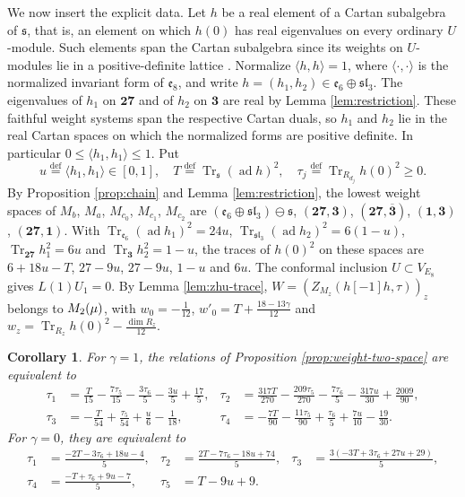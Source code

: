 \documentclass[leqno]{article}
\let\cal\relax
\newcommand{\cal}{\mathcal}
\renewcommand{\leq}{\ensuremath{\leqslant}}
\renewcommand{\geq}{\ensuremath{\geqslant}}
\newcommand{\ov}{\overset}
\newtheorem{cor}[thm]{Corollary}
\numberwithin{equation}{section}
\begin{document}
We now insert the explicit data. Let $h$ be a real element of a Cartan subalgebra of $\mathfrak s$, that is, an element on which $h(0)$ has real eigenvalues on every ordinary $U$-module. Such elements span the Cartan subalgebra since its weights on $U$-modules lie in a positive-definite lattice \cite[Theorem 1 p.~3]{Mas14}. Normalize $\langle h,h\rangle = 1$, where $\langle\cdot,\cdot\rangle$ is the normalized invariant form of $\mathfrak e_8$, and write $h = (h_1,h_2) \in \mathfrak e_6 \oplus \mathfrak{sl}_3$. The eigenvalues of $h_1$ on $\mathbf{27}$ and of $h_2$ on $\mathbf3$ are real by Lemma \ref{lem:restriction}. These faithful weight systems span the respective Cartan duals, so $h_1$ and $h_2$ lie in the real Cartan spaces on which the normalized forms are positive definite. In particular $0 \leq \langle h_1,h_1\rangle \leq 1$. Put
\[
u \ov{\mathrm{def}}{=} \langle h_1,h_1\rangle \in [0,1],\quad T \ov{\mathrm{def}}{=} \operatorname{Tr}_{\mathfrak s}(\operatorname{ad}h)^2,\quad \tau_j \ov{\mathrm{def}}{=} \operatorname{Tr}_{R_{d_j}}h(0)^2 \geq 0.
\]
By Proposition \ref{prop:chain} and Lemma \ref{lem:restriction}, the lowest weight spaces of $M_b$, $M_a$, $M_{c_0}$, $M_{c_1}$, $M_{c_2}$ are $(\mathfrak e_6 \oplus \mathfrak{sl}_3) \ominus \mathfrak s$, $(\mathbf{27},\mathbf 3)$, $(\mathbf{27},\overline{\mathbf 3})$, $(\mathbf 1,\mathbf 3)$, $(\mathbf{27},\mathbf 1)$. With $\operatorname{Tr}_{\mathfrak e_6}(\operatorname{ad}h_1)^2 = 24u$, $\operatorname{Tr}_{\mathfrak{sl}_3}(\operatorname{ad}h_2)^2 = 6(1-u)$, $\operatorname{Tr}_{\mathbf{27}}h_1^2 = 6u$ and $\operatorname{Tr}_{\mathbf 3}h_2^2 = 1-u$, the traces of $h(0)^2$ on these spaces are $6+18u-T$, $27-9u$, $27-9u$, $1-u$ and $6u$. The conformal inclusion $U \subset V_{E_8}$ gives $L(1)U_1 = 0$. By Lemma \ref{lem:zhu-trace}, $W = (Z_{M_z}(h[-1]h,\tau))_z$ belongs to $\cal M_2(\mu)$, with $w_0 = -\frac{1}{12}$, $w'_0 = T+\frac{18-13\gamma}{12}$ and $w_z = \operatorname{Tr}_{R_z}h(0)^2-\frac{\dim R_z}{12}$.

\begin{cor}
\label{cor:tau-formulas}
For $\gamma = 1$, the relations of Proposition \ref{prop:weight-two-space} are equivalent to
\begin{align*}
\tau_1 & = \tfrac{T}{15}-\tfrac{7\tau_5}{15}-\tfrac{3\tau_6}{5}-\tfrac{3u}{5}+\tfrac{17}{5}, & \tau_2 & = \tfrac{317T}{270}-\tfrac{209\tau_5}{270}-\tfrac{7\tau_6}{5}-\tfrac{317u}{30}+\tfrac{2009}{90},\\
\tau_3 & = -\tfrac{T}{54}+\tfrac{\tau_5}{54}+\tfrac{u}{6}-\tfrac{1}{18}, & \tau_4 & = -\tfrac{7T}{90}-\tfrac{11\tau_5}{90}+\tfrac{\tau_6}{5}+\tfrac{7u}{10}-\tfrac{19}{30}.
\end{align*}
For $\gamma = 0$, they are equivalent to
\begin{align*}
\tau_1 & = \tfrac{-2T-3\tau_6+18u-4}{5}, & \tau_2 & = \tfrac{2T-7\tau_6-18u+74}{5}, & \tau_3 & = \tfrac{3(-3T+3\tau_6+27u+29)}{5},\\
\tau_4 & = \tfrac{-T+\tau_6+9u-7}{5}, & \tau_5 & = T-9u+9.
\end{align*}
\end{cor}
\end{document}
